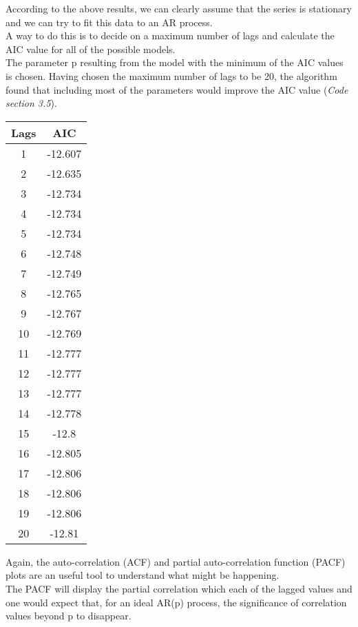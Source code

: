 \documentclass[11pt]{article}
\begin{document}
{According to the above results, we can clearly assume that the series is stationary and we can try to fit this data to an AR process.\\
A way to do this is to decide on a maximum number of lags and calculate the AIC value for all of the possible models.\\
The parameter p resulting from the model with the minimum of the AIC values is chosen. Having chosen the maximum number of lags to be 20, the algorithm found that including most of the parameters would improve the AIC value (\textsl{Code section 3.5}).
\medskip
\begin{center}
\begin{tabular}{|c|c|}
	\hline 
	\textbf{Lags}&\textbf{AIC}  \\ 
	\hline 
	1&-12.607  \\ 
	\hline 
	2&-12.635  \\ 
	\hline 
	3&-12.734  \\ 
	\hline 
	4&-12.734  \\ 
	\hline 
	5&-12.734  \\ 
	\hline 
	6&-12.748  \\ 
	\hline 
	7&-12.749  \\ 
	\hline 
	8&-12.765  \\ 
	\hline 
	9&-12.767  \\ 
	\hline 
	10&-12.769  \\ 
	\hline 
	11&-12.777  \\ 
	\hline 
	12&-12.777  \\ 
	\hline 
	13&-12.777  \\ 
	\hline 
	14&-12.778  \\ 
	\hline 
	15&-12.8  \\ 
	\hline 
	16&-12.805  \\ 
	\hline 
	17&-12.806  \\ 
	\hline 
	18&-12.806  \\ 
	\hline 
	19&-12.806  \\ 
	\hline 
	20&-12.81  \\ 
	\hline 
\end{tabular} 
\end{center}

Again, the auto-correlation (ACF) and partial auto-correlation function (PACF) plots are an useful tool to understand what might be happening.\\ The PACF will display the partial correlation which each of the lagged values and one would expect that, for an ideal AR(p) process, the significance of correlation values beyond p to disappear.\\

}
\end{document}
